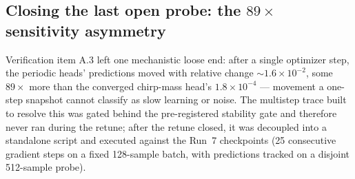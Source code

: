 \subsection{Closing the last open probe: the $89\times$ sensitivity asymmetry}
\label{sec:phicpsi:asymmetry}

Verification item A.3 left one mechanistic loose end: after a single optimizer step, the periodic heads' predictions moved with relative change ${\sim}1.6 \times 10^{-2}$, some $89\times$ more than the converged chirp-mass head's $1.8 \times 10^{-4}$ --- movement a one-step snapshot cannot classify as slow learning or noise.
The multistep trace built to resolve this was gated behind the pre-registered stability gate and therefore never ran during the retune; after the retune closed, it was decoupled into a standalone script and executed against the Run~7 checkpoints (25 consecutive gradient steps on a fixed 128-sample batch, with predictions tracked on a disjoint 512-sample probe).

